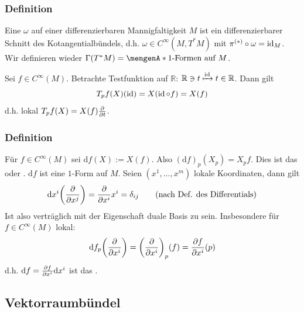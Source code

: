 \subsubsection[Definition: $1$-Form]{Definition} %
\label{ssub:421}
Eine  $\omega$ auf einer differenzierbaren Mannigfaltigkeit $M$ ist ein differenzierbarer Schnitt des Kotangentialbündels, d.h. 
$\omega \in C^\infty(M, T^*M)$ mit $\pi^{(*)} \circ \omega = \operatorname{id}_M$. Wir definieren wieder $\Gamma(T^*M) = \set{1 \text{-Formen auf }M}$.

Sei $f \in C^\infty(M)$. Betrachte Testfunktion auf $\mathds{R}$: $\mathbb{R} \ni t \xmapsto{\operatorname{id}} t \in \mathbb{R}$. Dann gilt
\[
	T_p f (X) (\operatorname{id}) = X( \operatorname{id} \circ f) = X(f)
\]
d.h. lokal $T_p f(X) = X(f) \frac{{\partial }}{{\partial t}} $.

\subsubsection[Definition: Totales Differential]{Definition} %
\label{ssub:422}
Für $f \in C^\infty(M)$ sei $\mathrm{d} f(X) := X(f)$. Also $(\mathrm{d}f)_p (X_p) = X_p f$. Dies ist das  oder 
. $\mathrm{d}f$ ist eine $1$-Form auf $M$. Seien $(x^1, \ldots , x^m)$ lokale Koordinaten, dann gilt
\[
	\mathrm{d}x^i \enbrace*{\diff{}{x^j} } = \diff{}{x^i} x^i = \delta_{ij}  \tag{nach Def. des Differentials}
\]
Ist also verträglich mit der Eigenschaft duale Basis zu sein. Insbesondere für $f \in C^\infty(M)$ lokal:
\[
	\mathrm{d} f_p \enbrace*{\diff{}{x^i} } = \enbrace*{\diff{}{x^i} }_p (f) = \diff{f}{x^i} (p)   
\]
d.h. $\mathrm{d} f = \frac{{\partial f}}{{\partial x^i}}  \mathrm{d}x^i $ ist das . 

\subsection{Vektorraumbündel} %
\label{sub:43}
